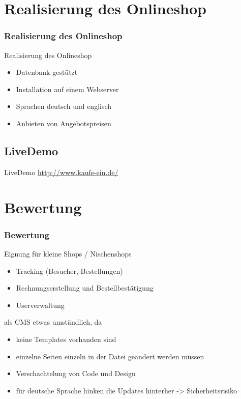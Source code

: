 \documentclass[xcolor=dvipsnames]{beamer}
\begin{document}
\section{Realisierung des Onlineshop}
\begin{frame} %
  \frametitle{Realisierung des Onlineshop} %
  \begin{block}{Realisierung des Onlineshop}
	  \begin{itemize}
		\item Datenbank gestützt
		\item Installation auf einem Webserver
		\item Sprachen deutsch und englisch
		\item Anbieten von Angebotspreisen
	  \end{itemize}
  \end{block}
\end{frame}

\subsection{LiveDemo}
\begin{frame} %
  \begin{block}{LiveDemo}
		\url{http://www.kaufe-ein.de/}
  \end{block}
\end{frame}

\section{Bewertung}
\begin{frame} %
  \frametitle{Bewertung} %
  \begin{block}{Eignung für kleine Shops / Nischenshops }
	  \begin{itemize}
		\item Tracking (Besucher, Bestellungen)
		\item Rechnungserstellung und Bestellbestätigung
		\item Userverwaltung
	  \end{itemize}
  \end{block}
  \begin{alertblock}{als CMS etwas umständlich, da }
	  \begin{itemize}
		\item keine Templates vorhanden sind 
		\item einzelne Seiten einzeln in der Datei geändert werden müssen
		\item Verschachtelung von Code und Design
		\item für deutsche Sprache hinken die Updates hinterher -> Sicherheitsrisiko
	  \end{itemize}
  \end{alertblock}
\end{frame}
\end{document}
